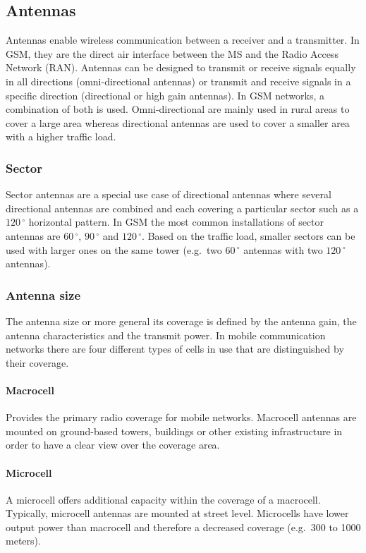 \documentclass[master,english]{hgbthesis}
\begin{document}
\subsection{Antennas}

Antennas enable wireless communication between a receiver and a transmitter. In GSM, they are the direct air interface between the MS and the Radio Access Network (RAN). Antennas can be designed to transmit or receive signals equally in all directions (omni-directional antennas) or transmit and receive signals in a specific direction (directional or high gain antennas). In GSM networks, a combination of both is used. Omni-directional are mainly used in rural areas to cover a large area whereas directional antennas are used to cover a smaller area with a higher traffic load.

\subsubsection{Sector}

Sector antennas are a special use case of directional antennas where several directional antennas are combined and each covering a particular sector such as a $120\,^{\circ}$ horizontal pattern. In GSM the most common installations of sector antennas are $60\,^{\circ}$, $90\,^{\circ}$ and $120\,^{\circ}$. Based on the traffic load, smaller sectors can be used with larger ones on the same tower (e.g.\ two $60\,^{\circ}$ antennas with two $120\,^{\circ}$ antennas).

\subsubsection{Antenna size}

The antenna size or more general its coverage is defined by the antenna gain, the antenna characteristics and the transmit power. In mobile communication networks there are four different types of cells in use that are distinguished by their coverage.

\paragraph{Macrocell} Provides the primary radio coverage for mobile networks. Macrocell antennas are mounted on ground-based towers, buildings or other existing infrastructure in order to have a clear view over the coverage area. 

\paragraph{Microcell} A microcell offers additional capacity within the coverage of a macrocell. Typically, microcell antennas are mounted at street level. Microcells have lower output power than macrocell and therefore a decreased coverage (e.g.\ 300 to 1000 meters).
\end{document}
